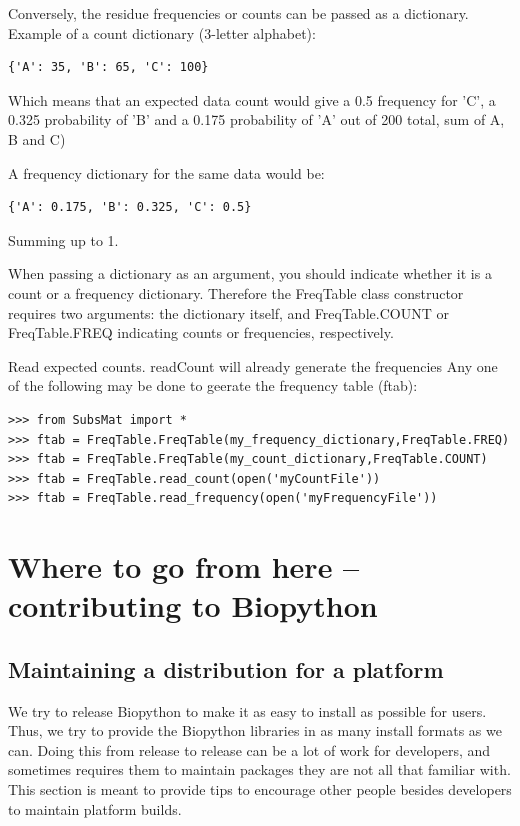 \documentclass{report}
\begin{document}
\begin{enumerate}
Conversely, the residue frequencies or counts can be passed as a dictionary. 
Example of a count dictionary (3-letter alphabet):

\begin{verbatim}
{'A': 35, 'B': 65, 'C': 100}
\end{verbatim}

Which means that an expected data count would give a 0.5 frequency 
for 'C', a 0.325 probability of 'B' and a 0.175 probability of 'A' 
out of 200 total, sum of A, B and C)
 
 A frequency dictionary for the same data would be:

\begin{verbatim}
{'A': 0.175, 'B': 0.325, 'C': 0.5}
\end{verbatim}

Summing up to 1.

When passing a dictionary as an argument, you should indicate whether it is a count or a frequency dictionary. Therefore the FreqTable class constructor requires two arguments: the dictionary itself, and FreqTable.COUNT or FreqTable.FREQ indicating counts or frequencies, respectively.


Read expected counts. readCount will already generate the frequencies
Any one of the following may be done to geerate the frequency table (ftab):

\begin{verbatim}
>>> from SubsMat import *
>>> ftab = FreqTable.FreqTable(my_frequency_dictionary,FreqTable.FREQ)
>>> ftab = FreqTable.FreqTable(my_count_dictionary,FreqTable.COUNT)
>>> ftab = FreqTable.read_count(open('myCountFile'))
>>> ftab = FreqTable.read_frequency(open('myFrequencyFile'))
\end{verbatim}

\end{enumerate}


\chapter{Where to go from here -- contributing to Biopython}

\section{Maintaining a distribution for a platform}
\label{sec:maintain_dist}

We try to release Biopython to make it as easy to install as possible for users. Thus, we try to provide the Biopython libraries in as many install formats as we can. Doing this from release to release can be a lot of work for developers, and sometimes requires them to maintain packages they are not all that familiar with. This section is meant to provide tips to encourage other people besides developers to maintain platform builds.
\end{document}
